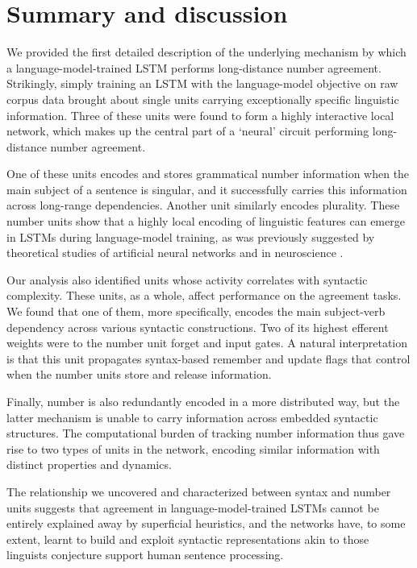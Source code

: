 \section{Summary and discussion}
We provided the first  detailed description of the underlying mechanism by which a language-model-trained LSTM performs long-distance  number agreement. %
Strikingly, simply training an LSTM with the language-model objective on raw corpus data brought about single units carrying exceptionally specific linguistic information. Three of these units were found to form a highly interactive local network, which makes up the central part of a `neural' circuit performing long-distance number agreement.

One of these units encodes and stores grammatical number information
when the main subject of a sentence is singular, and it successfully
carries this information across long-range dependencies. Another unit
similarly encodes plurality. These number units show that a highly
local encoding of linguistic features can emerge in LSTMs during
language-model training, as was previously suggested by theoretical
studies of artificial neural networks \cite[e.g.][]{Bowers:2009} and in
neuroscience \cite[e.g.,][]{Kutter:etal:2018}.

Our analysis also identified units whose activity correlates with syntactic complexity. These units, as a whole, affect performance on the agreement tasks. We found that one of them, more specifically, encodes the main subject-verb dependency across various syntactic constructions. Two of its highest efferent weights were to the number unit forget and input gates. A natural interpretation is that this unit propagates syntax-based remember and update flags that control when the number units store and release information. %

Finally, number is also redundantly encoded in a more distributed way, but the latter mechanism is unable to carry information across embedded syntactic structures. The computational burden of tracking number information thus gave rise to two types of units in the network,  encoding similar information  with distinct properties and dynamics.

The relationship we uncovered and characterized between syntax and number units suggests that agreement in language-model-trained LSTMs cannot be entirely explained away by superficial heuristics, and the networks have, to some extent, learnt to build and exploit syntactic representations akin to those linguists conjecture support human sentence processing.

